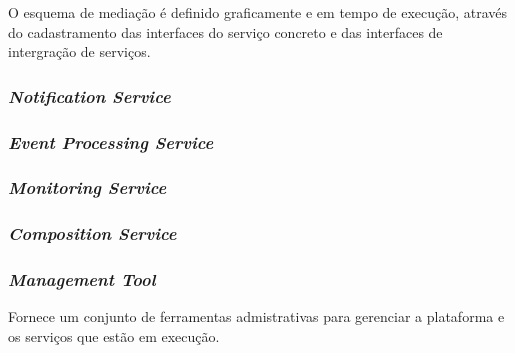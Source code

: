 O esquema de mediação é definido graficamente e em tempo de execução, através do cadastramento das interfaces do serviço concreto e das interfaces de intergração de serviços.

\subsubsection{\textit{Notification Service}}

\subsubsection{\textit{Event Processing Service}}
\label{subsec:cep}

\subsubsection{\textit{Monitoring Service}}
\label{subsec:monit_serv}

\subsubsection{\textit{Composition Service}}

\subsubsection{\textit{Management Tool}}
Fornece um conjunto de ferramentas admistrativas para gerenciar a plataforma e os serviços que estão em execução.

